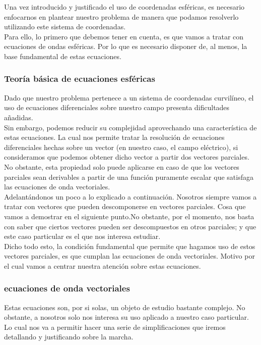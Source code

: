 \documentclass{article}
\begin{document}
Una vez introducido y justificado el uso de coordenadas esféricas, es necesario enfocarnos en plantear nuestro problema de manera que podamos resolverlo utilizando este sistema de coordenadas. \\
Para ello, lo primero que debemos tener en cuenta, es que vamos a tratar con ecuaciones de ondas esféricas. Por lo que es necesario disponer de, al menos, la base fundamental de estas ecuaciones.

\subsubsection{Teoría básica de ecuaciones esféricas}

Dado que nuestro problema pertenece a un sistema de coordenadas curvilíneo,  el uso de ecuaciones diferenciales sobre nuestro campo presenta dificultades añadidas. \\
Sin embargo, podemos reducir su complejidad aprovechando una característica de estas ecuaciones. La cual nos permite tratar la resolución de ecuaciones diferenciales hechas sobre un vector (en nuestro caso, el campo eléctrico), si consideramos que podemos obtener dicho vector a partir dos vectores parciales.\\
No obstante, esta propiedad  solo puede aplicarse en caso de que los vectores parciales sean derivables a partir de una función puramente escalar que satisfaga las ecuaciones de onda vectoriales. \\

Adelantándonos un poco a lo explicado a continuación. Nosotros  siempre vamos a tratar con vectores que pueden descomponerse en vectores parciales. Cosa que vamos a demostrar en el siguiente punto.No obstante, por el momento, nos basta con saber que ciertos vectores pueden ser descompuestos en otros parciales; y que este caso particular es el que nos interesa estudiar.
\\
Dicho todo esto, la condición fundamental que permite que hagamos uso de estos vectores parciales, es que cumplan las ecuaciones de onda vectoriales. Motivo por el cual vamos a centrar nuestra atención sobre estas ecuaciones.

\subsubsection{ecuaciones de onda vectoriales}

Estas ecuaciones son, por si solas, un objeto de estudio bastante complejo.  No obstante, a nosotros solo nos interesa su uso aplicado a nuestro caso particular.
Lo cual nos va a permitir hacer una serie de simplificaciones que iremos detallando y justificando sobre la marcha.\\
\end{document}
